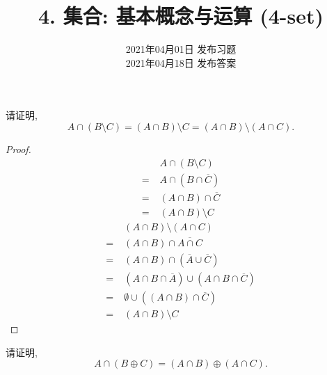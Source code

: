 \documentclass[a4paper, justified]{tufte-handout}
\title{4. 集合: 基本概念与运算 (4-set)}
\date{2021年04月01日 发布习题\\ 2021年04月18日 发布答案}
\begin{document}
\maketitle
\noplagiarism %
\begin{abstract}
\end{abstract}
\beginrequired

\begin{problem}
  请证明,
  \[
    A \cap (B \setminus C) = (A \cap B) \setminus C
                           = (A \cap B) \setminus (A \cap C).
  \]
\end{problem}

\begin{proof}
  \begin{align}
    &A \cap (B \setminus C) \\
    =\; & A \cap (B \cap \overline{C}) \\
    =\; & (A \cap B) \cap \overline{C} \\
    =\; & (A \cap B) \setminus C
  \end{align}
  \begin{align}
    &(A \cap B) \setminus (A \cap C) \\
    =\; & (A \cap B) \cap \overline{A \cap C} \\
    =\; & (A \cap B) \cap (\overline{A} \cup \overline{C}) \\
    =\; & (A \cap B \cap \overline{A}) \cup (A \cap B \cap \overline{C}) \\
    =\; & \emptyset \cup ((A \cap B) \cap \overline{C}) \\
    =\; & (A \cap B) \setminus C
  \end{align}
\end{proof}

\begin{problem}
  请证明,
  \[
    A \cap (B \oplus C) = (A \cap B) \oplus (A \cap C).
  \]
\end{problem}
\end{document}
